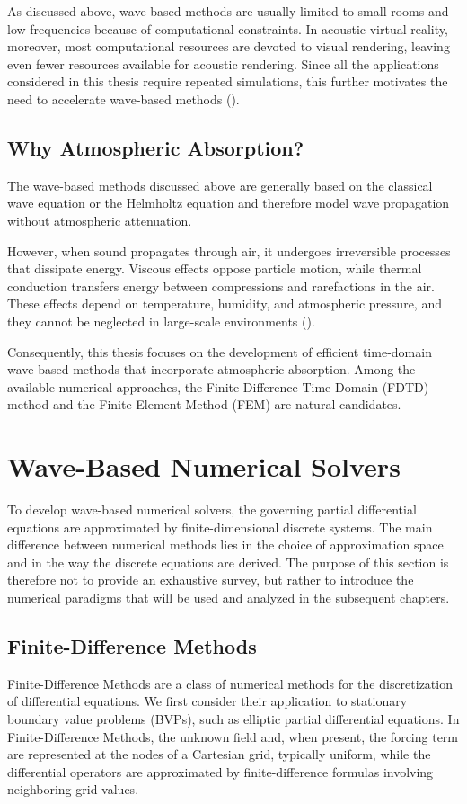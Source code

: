 \documentclass{Configuration_Files/PoliMi3i_thesis}
\begin{document}
As discussed above, wave-based methods are usually limited to small rooms and low frequencies because of computational constraints. In acoustic virtual reality, moreover, most computational resources are devoted to visual rendering, leaving even fewer resources available for acoustic rendering. Since all the applications considered in this thesis require repeated simulations, this further motivates the need to accelerate wave-based methods (\cite{kleiner_auralization_1993,council_virtual_1995,savioja_creating_1999,sampedro_llopis_reduced_2023}).

\subsection{Why Atmospheric Absorption?}
The wave-based methods discussed above are generally based on the classical wave equation or the Helmholtz equation and therefore model wave propagation without atmospheric attenuation.

However, when sound propagates through air, it undergoes irreversible processes that dissipate energy. Viscous effects oppose particle motion, while thermal conduction transfers energy between compressions and rarefactions in the air. These effects depend on temperature, humidity, and atmospheric pressure, and they cannot be neglected in large-scale environments (\cite{evans_atmospheric_1972}).

Consequently, this thesis focuses on the development of efficient time-domain wave-based methods that incorporate atmospheric absorption. Among the available numerical approaches, the Finite-Difference Time-Domain (FDTD) method and the Finite Element Method (FEM) are natural candidates.
%
\section{Wave-Based Numerical Solvers}
To develop wave-based numerical solvers, the governing partial differential equations are approximated by finite-dimensional discrete systems. The main difference between numerical methods lies in the choice of approximation space and in the way the discrete equations are derived. The purpose of this section is therefore not to provide an exhaustive survey, but rather to introduce the numerical paradigms that will be used and analyzed in the subsequent chapters.
%
\subsection{Finite-Difference Methods}
Finite-Difference Methods are a class of numerical methods for the discretization of differential equations. We first consider their application to stationary boundary value problems (BVPs), such as elliptic partial differential equations. In Finite-Difference Methods, the unknown field and, when present, the forcing term are represented at the nodes of a Cartesian grid, typically uniform, while the differential operators are approximated by finite-difference formulas involving neighboring grid values.
\end{document}
